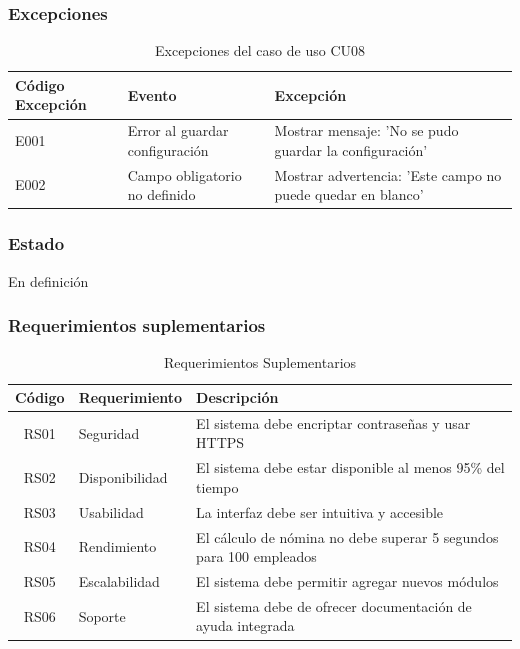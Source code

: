 \subsubsection*{Excepciones}
\begin{table}[h]
	\centering
	\caption{Excepciones del caso de uso CU08}
	\begin{tabular}{|p{3cm}|p{5cm}|p{5cm}|}
		\hline
		\textbf{Código Excepción} & \textbf{Evento}                & \textbf{Excepción}                                          \\ \hline
		E001                      & Error al guardar configuración & Mostrar mensaje: 'No se pudo guardar la configuración'      \\ \hline
		E002                      & Campo obligatorio no definido  & Mostrar advertencia: 'Este campo no puede quedar en blanco' \\ \hline
	\end{tabular}
\end{table}

\newpage

\subsubsection*{Estado}
En definición


\subsubsection*{Requerimientos suplementarios}

\begin{table}[h]
	\centering
	\caption{Requerimientos Suplementarios}
	\begin{tabular}{|c|p{4cm}|p{8cm}|}
		\hline
		\textbf{Código} & \textbf{Requerimiento} & \textbf{Descripción}                                               \\ \hline
		RS01            & Seguridad              & El sistema debe encriptar contraseñas y usar HTTPS                 \\ \hline
		RS02            & Disponibilidad         & El sistema debe estar disponible al menos 95\% del tiempo          \\ \hline
		RS03            & Usabilidad             & La interfaz debe ser intuitiva y accesible                         \\ \hline
		RS04            & Rendimiento            & El cálculo de nómina no debe superar 5 segundos para 100 empleados \\ \hline
		RS05            & Escalabilidad          & El sistema debe permitir agregar nuevos módulos                    \\ \hline
		RS06            & Soporte                & El sistema debe de ofrecer documentación de ayuda integrada        \\ \hline
	\end{tabular}
\end{table}

